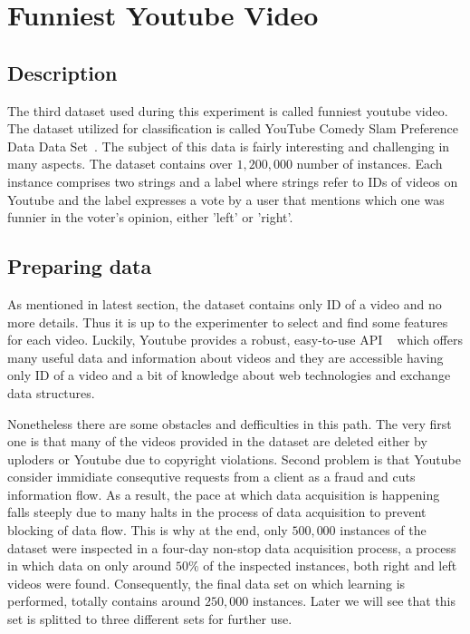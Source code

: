 \section{Funniest Youtube Video}
\label{db:sec:ds3}
\subsection{Description}

The third dataset used during this experiment is called funniest youtube video.
The dataset utilized for classification is called YouTube Comedy Slam Preference
Data Data Set~\cite{}. The subject of this data is fairly interesting and
challenging in many aspects. The dataset contains over $1,200,000$ number
of instances. Each instance comprises two strings and a label where strings
refer to IDs of videos on Youtube and the label expresses a vote by a
user that mentions which one was funnier in the voter's opinion, either 'left'
or 'right'.

\subsection{Preparing data}

As mentioned in latest section, the dataset contains only ID of a video and no
more details. Thus it is up to the experimenter to select and find some features
for each video. Luckily, Youtube provides a robust, easy-to-use API ~\cite{}
which offers many useful data and information about videos and they are accessible having
only ID of a video and a bit of knowledge about web technologies and
exchange data structures. 

Nonetheless there are some obstacles and defficulties
in this path. The very first one is that many of the videos provided in the
dataset are deleted either by uploders or Youtube due to copyright violations.
Second problem is that Youtube consider immidiate consequtive requests from a
client as a fraud and cuts information flow. As a result, the pace at which data
acquisition is happening falls steeply due to many halts in the process of
data acquisition to prevent blocking of data flow. This is why at the end, only
$500,000$ instances of the dataset were inspected in a four-day non-stop data
acquisition process, a process in which data on only around $50\%$ of the
inspected instances, both right and left videos were found. Consequently, the
final data set on which learning is performed, totally contains around $250,000$
instances. Later we will see that this set is splitted to three different sets
for further use.

